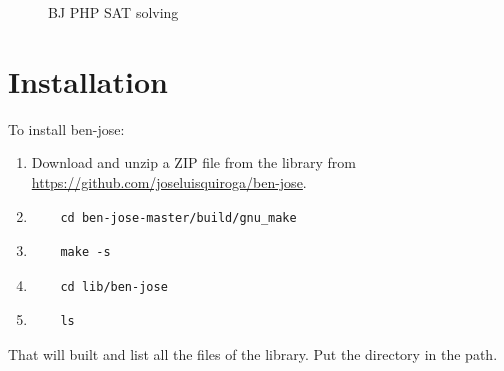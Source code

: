 \documentclass{easychair}
\begin{document}
\begin{figure}[H]
	\begin{centering}
		\caption{BJ PHP SAT solving}
		\label{fig:results-2}
	\end{centering}
\end{figure}


\section{Installation}
\label{sect:installation}

To install ben-jose:

\begin{enumerate}
\item
Download and unzip a ZIP file from the library from \url{https://github.com/joseluisquiroga/ben-jose}.

\item
\begin{verbatim}
	cd ben-jose-master/build/gnu_make
\end{verbatim}

\item
\begin{verbatim}
	make -s
\end{verbatim}

\item
\begin{verbatim}
	cd lib/ben-jose
\end{verbatim}

\item
\begin{verbatim}
	ls
\end{verbatim}
\end{enumerate}

That will built and list all the files of the library. Put the directory in the path.

\end{document}
